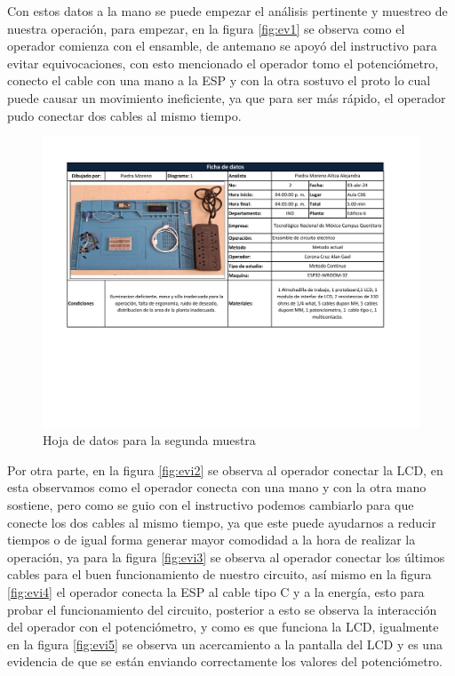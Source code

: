     
     Con estos datos a la mano se puede empezar el análisis pertinente y muestreo de nuestra operación, para empezar, en la figura \ref{fig:ev1} se observa como el operador comienza con el ensamble, de antemano se apoyó del instructivo para evitar equivocaciones, con esto mencionado el operador tomo el potenciómetro, conecto el cable con una mano a la ESP y con la otra sostuvo el proto lo cual puede causar un movimiento ineficiente, ya que para ser más rápido, el operador pudo conectar dos cables al mismo tiempo.
    
    \begin{figure}[H]
        \centering
        \includegraphics[trim = {17mm 70mm 25mm 15mm},clip,scale=0.37]{22/Img/hojaDeDatos2.pdf}
        \caption{Hoja de datos para la segunda muestra}
        \label{fig:hoja2}
    \end{figure}
    
     
     Por otra parte, en la figura \ref{fig:evi2} se observa al operador conectar la LCD, en esta observamos como el operador conecta con una mano y con la otra mano sostiene, pero como se guio con el instructivo podemos cambiarlo para que conecte los dos cables al mismo tiempo, ya que este puede ayudarnos a reducir tiempos o de igual forma generar mayor comodidad a la hora de realizar la operación, ya para la figura \ref{fig:evi3} se observa  al operador conectar los últimos cables para el buen funcionamiento de nuestro circuito, así mismo en la figura \ref{fig:evi4} el operador conecta la ESP al cable tipo C y a la energía, esto para probar el funcionamiento del circuito, posterior a esto se observa la interacción del operador con el potenciómetro, y como es que funciona la LCD, igualmente en la figura \ref{fig:evi5} se observa un acercamiento a la pantalla del LCD y es una evidencia de que se están enviando correctamente los valores del potenciómetro.
    
